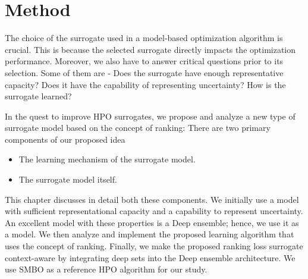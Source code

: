\documentclass[12pt, twoside, ngerman]{report}
\begin{document}

\chapter{Method}\label{chap:ProposedIdea}


The choice of the surrogate used in a model-based optimization algorithm is crucial. This is because the selected surrogate directly impacts the optimization performance.
Moreover, we also have to answer critical questions prior to its selection. Some of them are - Does the surrogate have enough representative capacity?
Does it have the capability of representing uncertainty?
How is the surrogate learned?

In the quest to improve HPO surrogates,  we propose and analyze a new type of surrogate model based on the concept of ranking:
There are two primary components of our proposed idea

\begin{itemize}
\item The learning mechanism of the surrogate model.
\item The surrogate model itself.
\end{itemize}

This chapter discusses in detail both these components.
We initially use a model with sufficient representational capacity and a capability to represent uncertainty.
An excellent model with these properties is a Deep ensemble; hence, we use it as a model.
We then analyze and implement the proposed learning algorithm that uses the concept of ranking.
Finally, we make the proposed ranking loss surrogate context-aware by integrating deep sets into the Deep ensemble architecture.
We use SMBO as a reference HPO algorithm for our study.
\end{document}
